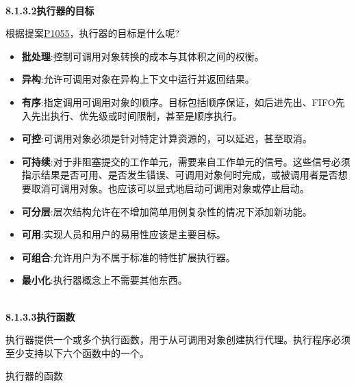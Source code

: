 \hspace*{\fill} \\ %
\noindent
\textbf{8.1.3.2\hspace{0.2cm}执行器的目标}

根据提案\href{http://open-std.org/JTC1/SC22/WG21/docs/papers/2018/p1055r0.pdf}{P1055}，执行器的目标是什么呢?

\begin{itemize}
\item 
\textbf{批处理}:控制可调用对象转换的成本与其体积之间的权衡。

\item 
\textbf{异构}:允许可调用对象在异构上下文中运行并返回结果。

\item 
\textbf{有序}:指定调用可调用对象的顺序。目标包括顺序保证，如后进先出、FIFO先入先出执行、优先级或时间限制，甚至是顺序执行。

\item 
\textbf{可控}:可调用对象必须是针对特定计算资源的，可以延迟，甚至取消。

\item 
\textbf{可持续}:对于非阻塞提交的工作单元，需要来自工作单元的信号。这些信号必须指示结果是否可用、是否发生错误、可调用对象何时完成，或被调用者是否想要取消可调用对象。也应该可以显式地启动可调用对象或停止启动。

\item 
\textbf{可分层}:层次结构允许在不增加简单用例复杂性的情况下添加新功能。

\item 
\textbf{可用}:实现人员和用户的易用性应该是主要目标。
 
\item 
\textbf{可组合}:允许用户为不属于标准的特性扩展执行器。

\item 
\textbf{最小化}:执行器概念上不需要其他东西。
\end{itemize}

\hspace*{\fill} \\ %
\noindent
\textbf{8.1.3.3\hspace{0.2cm}执行函数}

执行器提供一个或多个执行函数，用于从可调用对象创建执行代理。执行程序必须至少支持以下六个函数中的一个。

\begin{center}
执行器的函数
\end{center}

